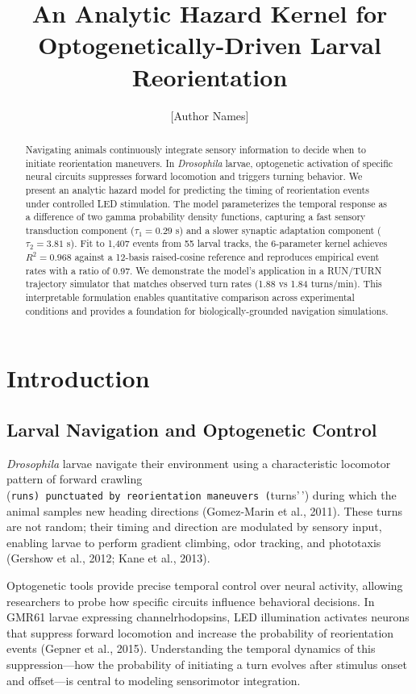 \documentclass[
  11pt,
  letterpaper,
]{article}
\title{An Analytic Hazard Kernel for Optogenetically-Driven Larval
Reorientation}
\author{{[}Author Names{]}}
\date{}
\begin{document}
\maketitle


\begin{abstract}
Navigating animals continuously integrate sensory information to decide when to initiate reorientation maneuvers. In \textit{Drosophila} larvae, optogenetic activation of specific neural circuits suppresses forward locomotion and triggers turning behavior. We present an analytic hazard model for predicting the timing of reorientation events under controlled LED stimulation. The model parameterizes the temporal response as a difference of two gamma probability density functions, capturing a fast sensory transduction component ($\tau_1 = 0.29$ s) and a slower synaptic adaptation component ($\tau_2 = 3.81$ s). Fit to 1,407 events from 55 larval tracks, the 6-parameter kernel achieves $R^2 = 0.968$ against a 12-basis raised-cosine reference and reproduces empirical event rates with a ratio of 0.97. We demonstrate the model's application in a RUN/TURN trajectory simulator that matches observed turn rates (1.88 vs 1.84 turns/min). This interpretable formulation enables quantitative comparison across experimental conditions and provides a foundation for biologically-grounded navigation simulations.
\end{abstract}

\section{Introduction}

\subsection{Larval Navigation and Optogenetic Control}

\textit{Drosophila} larvae navigate their environment using a
characteristic locomotor pattern of forward crawling
(\texttt{runs\textquotesingle{}\textquotesingle{})\ punctuated\ by\ reorientation\ maneuvers\ (}turns'\,')
during which the animal samples new heading directions (Gomez-Marin et
al., 2011). These turns are not random; their timing and direction are
modulated by sensory input, enabling larvae to perform gradient
climbing, odor tracking, and phototaxis (Gershow et al., 2012; Kane et
al., 2013).

Optogenetic tools provide precise temporal control over neural activity,
allowing researchers to probe how specific circuits influence behavioral
decisions. In GMR61 larvae expressing channelrhodopsins, LED
illumination activates neurons that suppress forward locomotion and
increase the probability of reorientation events (Gepner et al., 2015).
Understanding the temporal dynamics of this suppression---how the
probability of initiating a turn evolves after stimulus onset and
offset---is central to modeling sensorimotor integration.
\end{document}
